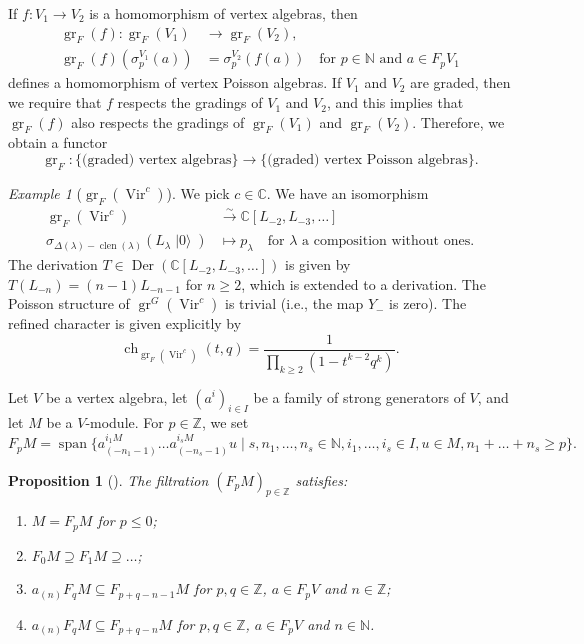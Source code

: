 \documentclass[a4paper, 12pt, reqno]{amsart}
\newtheorem{proposition}[theorem]{Proposition}
\theoremstyle{remark}
\newtheorem{example}[theorem]{Example}
\DeclareMathOperator{\Vir}{Vir}
\DeclareMathOperator{\ch}{ch}
\DeclareMathOperator{\clen}{clen}
\DeclareMathOperator{\vac}{|0\rangle}
\DeclareMathOperator{\gr}{gr}
\DeclareMathOperator{\vspan}{span}
\DeclareMathOperator{\Der}{Der}
\begin{document}
If $f: V_1 \to V_2$ is a homomorphism of vertex algebras, then
\begin{align*}
  \gr_F(f): \gr_F(V_1) &\to \gr_F(V_2), \\
  \gr_F(f)(\sigma^{V_1}_p(a)) &= \sigma^{V_2}_p(f(a)) \quad \text{for $p \in \mathbb{N}$ and $a \in F_pV_1$}
\end{align*}
defines a homomorphism of vertex Poisson algebras.
If $V_1$ and $V_2$ are graded, then we require that $f$ respects the gradings of $V_1$ and $V_2$, and this implies that $\gr_F(f)$ also respects the gradings of $\gr_F(V_1)$ and $\gr_F(V_2)$.
Therefore, we obtain a functor
\begin{equation*}
  \gr_F: \{\text{(graded) vertex algebras}\} \to \{\text{(graded) vertex Poisson algebras}\}.
\end{equation*}

\begin{example}[$\gr_F(\Vir^c)$]
  \label{exa:10}
  We pick $c \in \mathbb{C}$.
  We have an isomorphism
  \begin{align*}
    \gr_F(\Vir^c) &\xrightarrow{\sim} \mathbb{C}[L_{-2}, L_{-3}, \dots] \\
    \sigma_{\Delta(\lambda) - \clen(\lambda)}(L_{\lambda}\vac) &\mapsto p_{\lambda} \quad \text{for $\lambda$ a composition without ones}.
  \end{align*}
  The derivation $T \in \Der(\mathbb{C}[L_{-2}, L_{-3}, \dots])$ is given by $T(L_{-n}) = (n - 1)L_{-n - 1}$ for $n \ge 2$, which is extended to a derivation.
  The Poisson structure of $\gr^G(\Vir^c)$ is trivial (i.e., the map $Y_-$ is zero).
  The refined character is given explicitly by
  \begin{equation*}
    \ch_{\gr_F(\Vir^c)}(t, q) = \frac{1}{\prod_{k \ge 2}(1 - t^{k - 2}q^k)}.
  \end{equation*}
\end{example}

Let $V$ be a vertex algebra, let $(a^i)_{i \in I}$ be a family of strong generators of $V$, and let $M$ be a $V$-module.
For $p \in \mathbb{Z}$, we set
\begin{equation*}
  F_pM = \vspan\{a^{i_1M}_{(-n_1 - 1)}\dots a^{i_sM}_{(-n_s - 1)}u \mid s, n_1, \dots, n_s \in \mathbb{N}, i_1, \dots, i_s \in I, u \in M, n_1 + \dots + n_s \ge p\}.
\end{equation*}

\begin{proposition}[{\cite{li_abelianizing_2005}}]
  \label{prp:6}
  The filtration $(F_pM)_{p \in \mathbb{Z}}$ satisfies:
  \begin{enumerate}
  \item $M = F_pM$ for $p \le 0$;
  \item $F_0M \supseteq F_1M \supseteq \dots$;
  \item $a_{(n)}F_qM \subseteq F_{p + q - n - 1}M$ for $p, q \in \mathbb{Z}$, $a \in F_pV$ and $n \in \mathbb{Z}$;
  \item $a_{(n)}F_qM \subseteq F_{p + q - n}M$ for $p, q \in \mathbb{Z}$, $a \in F_pV$ and $n \in \mathbb{N}$.
  \end{enumerate}
\end{proposition}
\end{document}

